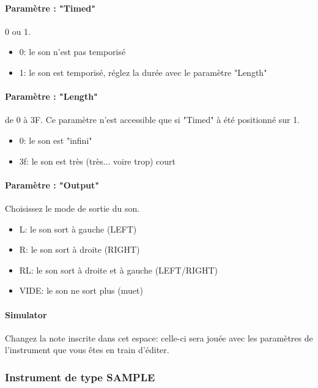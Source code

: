 \documentclass[12pt,a4paper]{article}
\begin{document}
    \paragraph{Paramètre : "Timed"} 0 ou 1.
    \medskip

    \begin{itemize}
            \item{0: le son n'est pas temporisé}
            \item{1: le son est temporisé, réglez la durée avec le paramètre "Length"}
        \end{itemize}

    \paragraph{Paramètre : "Length"} de 0 à 3F.
    Ce paramètre n'est accessible que si "Timed" à été positionné sur 1.
    \medskip

    \begin{itemize}
        \item{0: le son est "infini"}
        \item{3f: le son est très (très... voire trop) court}
    \end{itemize}

    \paragraph{Paramètre : "Output"} Choisissez le mode de sortie du son.
    \medskip
    \begin{itemize}
        \item{L: le son sort à gauche (LEFT)}
        \item{R: le son sort à droite (RIGHT)}
        \item{RL: le son sort à droite et à gauche (LEFT/RIGHT)}
        \item{VIDE: le son ne sort plus (muet)}
    \end{itemize}

    \paragraph{Simulator} Changez la note inscrite dans cet espace:
                celle-ci sera jouée avec les paramètres de l'instrument que vous êtes en train d'éditer.

    \subsubsection{Instrument de type SAMPLE}
\end{document}
